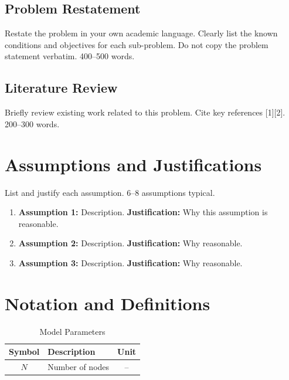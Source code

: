 \documentclass[12pt,letterpaper]{article}
\numberwithin{equation}{section}
\numberwithin{figure}{section}
\numberwithin{table}{section}
\begin{document}
\subsection{Problem Restatement}
\textlangle Restate the problem in your own academic language. Clearly list the known conditions and objectives for each sub-problem. Do not copy the problem statement verbatim. 400--500 words.\textrangle

\subsection{Literature Review}
\textlangle Briefly review existing work related to this problem. Cite key references [1][2]. 200--300 words.\textrangle

\section{Assumptions and Justifications}

\textlangle List and justify each assumption. 6--8 assumptions typical.\textrangle

\begin{enumerate}[label=\arabic*.]
    \item \textbf{Assumption 1:} \textlangle Description\textrangle. \textbf{Justification:} \textlangle Why this assumption is reasonable\textrangle.
    \item \textbf{Assumption 2:} \textlangle Description\textrangle. \textbf{Justification:} \textlangle Why reasonable\textrangle.
    \item \textbf{Assumption 3:} \textlangle Description\textrangle. \textbf{Justification:} \textlangle Why reasonable\textrangle.
\end{enumerate}

\section{Notation and Definitions}

\begin{table}[H]
\centering
\caption{Model Parameters}
\label{tab:parameters}
\begin{tabular}{c|l|c}
\toprule
\textbf{Symbol} & \textbf{Description} & \textbf{Unit} \\
\midrule
$N$ & Number of nodes & -- \\
\bottomrule
\end{tabular}
\end{table}
\end{document}
